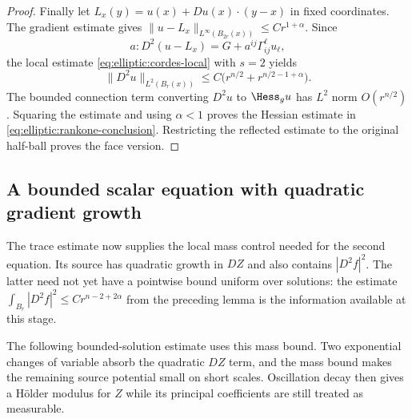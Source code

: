 \begin{proof}
Finally let $L_x(y)=u(x)+Du(x)\cdot(y-x)$ in fixed coordinates.
The gradient estimate gives
$\|u-L_x\|_{L^\infty(B_{2r}(x))}\leq Cr^{1+\alpha}$.
Since
\[
 a:D^2(u-L_x)=G+a^{ij}\Gamma^\ell_{ij}u_\ell,
\]
the local estimate \eqref{eq:elliptic:cordes-local} with $s=2$ yields
\[
 \|D^2u\|_{L^2(B_r(x))}
   \leq C\bigl(r^{n/2}+r^{n/2-1+\alpha}\bigr).
\]
The bounded connection term converting $D^2u$ to $\Hess_g u$ has
$L^2$ norm $O(r^{n/2})$.  Squaring the estimate and using $\alpha<1$
proves the Hessian estimate in
\eqref{eq:elliptic:rankone-conclusion}.  Restricting the reflected
estimate to the original half-ball proves the face version.
\end{proof}


\subsection{A bounded scalar equation with quadratic gradient growth}

The trace estimate now supplies the local mass control needed for
the second equation.  Its source has quadratic growth in $DZ$ and
also contains $|D^2f|^2$.  The latter need not yet have a pointwise
bound uniform over solutions: the estimate
$\int_{B_r}|D^2f|^2\le Cr^{n-2+2\alpha}$ from the preceding lemma
is the information available at this stage.

The following bounded-solution estimate uses this mass bound.  Two
exponential changes of variable absorb the quadratic
$DZ$ term, and the mass bound makes the remaining source potential
small on short scales.  Oscillation decay then gives a H\"older
modulus for $Z$ while its principal coefficients are still treated
as measurable.

